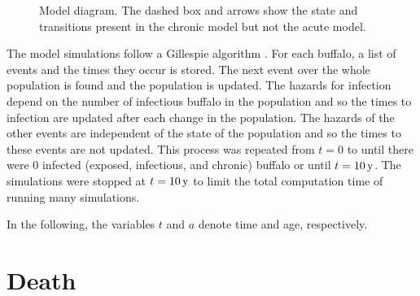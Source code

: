 \documentclass[12pt]{article}
\begin{document}
\begin{figure}
  \centering
  \textsf{}
  \caption{Model diagram.  The dashed box and arrows show the state
    and transitions present in the chronic model but not the acute
    model.}
  \label{fig:diagram}
\end{figure}


The model simulations follow a Gillespie algorithm
\autocite{gillespie_1977}. For each buffalo, a list of events and the
times they occur is stored. The next event over the whole population
is found and the population is updated.  The hazards for infection
depend on the number of infectious buffalo in the population and so
the times to infection are updated after each change in the
population.  The hazards of the other events are independent of the
state of the population and so the times to these events are not
updated.  This process was repeated from $t = 0$ to until there were
$0$ infected (exposed, infectious, and chronic) buffalo or until $t =
\unit[10]{y}$. The simulations were stopped at $t = \unit[10]{y}$ to
limit the total computation time of running many simulations.

In the following, the variables $t$ and $a$ denote time and age,
respectively.

\section{Death}
\end{document}
